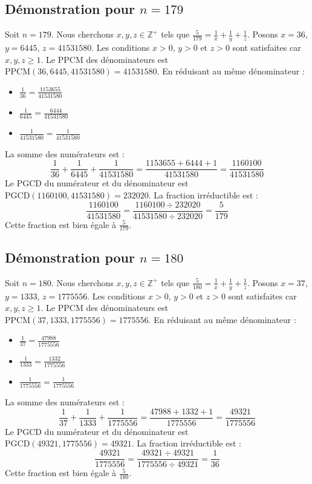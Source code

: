 \documentclass[11pt,a4paper]{article}
\begin{document}
\subsection{Démonstration pour $n = 179$}
Soit $n = 179$. Nous cherchons $x, y, z \in \mathbb{Z}^{+}$ tels que $\frac{5}{179} = \frac{1}{x} + \frac{1}{y} + \frac{1}{z}$.
Posons $x = 36$, $y = 6445$, $z = 41531580$.
Les conditions $x > 0$, $y > 0$ et $z > 0$ sont satisfaites car $x, y, z \geq 1$.
Le PPCM des dénominateurs est $\text{PPCM}(36, 6445, 41531580) = 41531580$.
En réduisant au même dénominateur :
\begin{itemize}
    \item $\frac{1}{36} = \frac{1153655}{41531580}$
    \item $\frac{1}{6445} = \frac{6444}{41531580}$
    \item $\frac{1}{41531580} = \frac{1}{41531580}$
\end{itemize}
La somme des numérateurs est :
$$ \frac{1}{36} + \frac{1}{6445} + \frac{1}{41531580} = \frac{1153655 + 6444 + 1}{41531580} = \frac{1160100}{41531580} $$
Le PGCD du numérateur et du dénominateur est $\text{PGCD}(1160100, 41531580) = 232020$.
La fraction irréductible est :
$$ \frac{1160100}{41531580} = \frac{1160100 \div 232020}{41531580 \div 232020} = \frac{5}{179} $$
Cette fraction est bien égale à $\frac{5}{179}$.

\subsection{Démonstration pour $n = 180$}
Soit $n = 180$. Nous cherchons $x, y, z \in \mathbb{Z}^{+}$ tels que $\frac{5}{180} = \frac{1}{x} + \frac{1}{y} + \frac{1}{z}$.
Posons $x = 37$, $y = 1333$, $z = 1775556$.
Les conditions $x > 0$, $y > 0$ et $z > 0$ sont satisfaites car $x, y, z \geq 1$.
Le PPCM des dénominateurs est $\text{PPCM}(37, 1333, 1775556) = 1775556$.
En réduisant au même dénominateur :
\begin{itemize}
    \item $\frac{1}{37} = \frac{47988}{1775556}$
    \item $\frac{1}{1333} = \frac{1332}{1775556}$
    \item $\frac{1}{1775556} = \frac{1}{1775556}$
\end{itemize}
La somme des numérateurs est :
$$ \frac{1}{37} + \frac{1}{1333} + \frac{1}{1775556} = \frac{47988 + 1332 + 1}{1775556} = \frac{49321}{1775556} $$
Le PGCD du numérateur et du dénominateur est $\text{PGCD}(49321, 1775556) = 49321$.
La fraction irréductible est :
$$ \frac{49321}{1775556} = \frac{49321 \div 49321}{1775556 \div 49321} = \frac{1}{36} $$
Cette fraction est bien égale à $\frac{5}{180}$.
\end{document}
